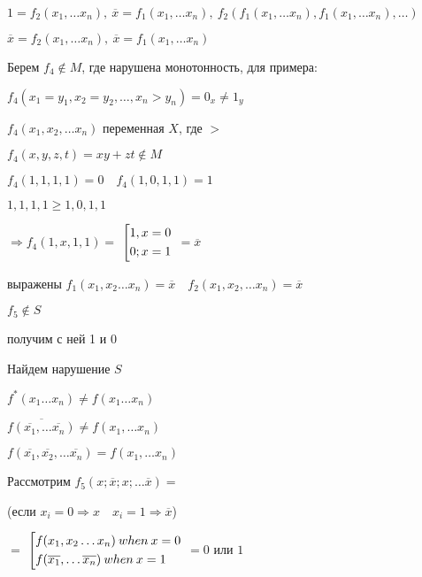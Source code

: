 \documentclass[russian]{lecture-notes}
\begin{document}
    $1 = f_2(x_1, \dots x_n), \: \overline{x} = f_1(x_1, \dots x_n), \: f_2(f_1(x_1, \dots x_n), f_1(x_1, \dots x_n), \dots)$

    $\overline{x} = f_2(x_1, \dots x_n), \: \overline{x} = f_1(x_1, \dots x_n)$

    Берем $f_4 \notin M$, где нарушена монотонность, для примера:

    $f_4(x_1 = y_1, x_2 = y_2, \dots, x_n > y_n) = 0_x \neq 1_y$

    $f_4(x_1, x_2, \dots x_n)$ переменная $X$, где $>$

    $f_4(x, y, z, t) = xy + zt \notin M$

    $f_4(1, 1, 1, 1) = 0 \quad f_4(1, 0, 1, 1) = 1$

    $1, 1, 1, 1 \geq 1, 0, 1, 1$

    $\Rightarrow f_4(1, x, 1, 1) = $
    $\left[
    \begin{gathered}
        1, x = 0 \hfill
        \\
        0; x = 1 \hfill
        \\
    \end{gathered}
    \right.$
    $ = \overline{x}$


    выражены $f_1(x_1, x_2 \dots x_n) = \overline{x} \quad f_2(x_1, x_2, \dots x_n) = \overline{x}$

    $f_5 \notin S$

    получим с ней 1 и 0

    Найдем нарушение $S$

    $f^*(x_1 \dots x_n) \neq f(x_1 \dots x_n)$

    $\overline{f(\overline{x_1}, \dots \overline{x_n})} \neq f(x_1, \dots x_n)$

    $f(\overline{x_1}, \overline{x_2}, \dots \overline{x_n}) = f(x_1, \dots x_n)$

    Рассмотрим $f_5(x; \overline{x}; x; \dots \overline{x}) = $

    (если $x_i = 0 \Rightarrow x \quad x_i = 1 \Rightarrow \overline{x}$)

    $= $
    $\left[
    \begin{gathered}
        f(x_1, x_2 \dots x_n) \: when \: x = 0 \hfill
        \\
        f(\overline{x_1}, \dots \overline{x_n}) \: when \: x = 1 \hfill
        \\
    \end{gathered}
    \right.$
    $ = 0$ или $1$
\end{document}
